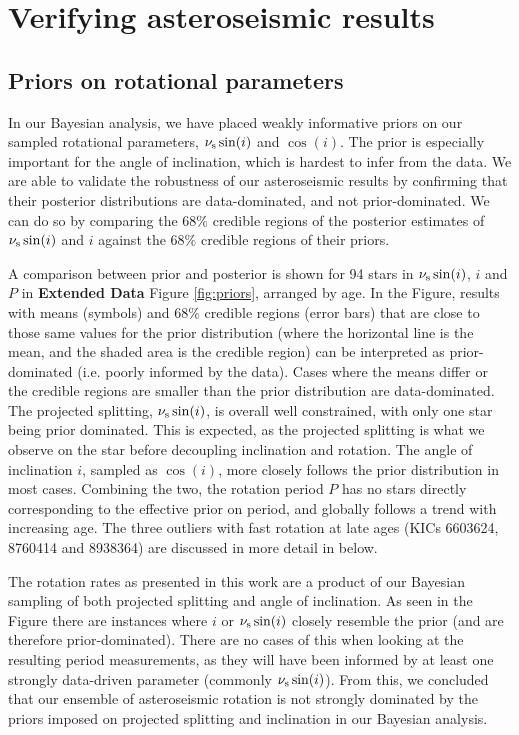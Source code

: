 \documentclass[12pt]{article}
\begin{document}
\section{Verifying asteroseismic results}
\subsection{Priors on rotational parameters}
In our Bayesian analysis, we have placed weakly informative priors on our sampled rotational parameters, $\nu_{\rm s}\sin(i)$ and $\cos(i)$. The prior is especially important for the angle of inclination, which is hardest to infer from the data. We are able to validate the robustness of our asteroseismic results by confirming that their posterior distributions are data-dominated, and not prior-dominated. We can do so by comparing the $68\%$ credible regions of the posterior estimates of $\nu_{\rm s}\sin(i)$ and $i$ against the $68\%$ credible regions of their priors.

A comparison between prior and posterior is shown for 94 stars in $\nu_{\rm s}\sin(i)$, $i$ and $P$ in \textbf{Extended Data} Figure \ref{fig:priors}, arranged by age. In the Figure, results with means (symbols) and $68\%$ credible regions (error bars) that are close to those same values for the prior distribution (where the horizontal line is the mean, and the shaded area is the credible region) can be interpreted as prior-dominated (i.e. poorly informed by the data). Cases where the means differ or the credible regions are smaller than the prior distribution are data-dominated. The projected splitting, $\nu_{\rm s}\sin(i)$, is overall well constrained, with only one star being prior dominated. This is expected, as the projected splitting is what we observe on the star before decoupling inclination and rotation. The angle of inclination $i$, sampled as $\cos(i)$, more closely follows the prior distribution in most cases. Combining the two, the rotation period $P$ has no stars directly corresponding to the effective prior on period, and globally follows a trend with increasing age. The three outliers with fast rotation at late ages (KICs 6603624, 8760414 and 8938364) are discussed in more detail in below.

The rotation rates as presented in this work are a product of our Bayesian sampling of both projected splitting and angle of inclination. As seen in the Figure there are instances where $i$ or $\nu_{\rm s}\sin(i)$ closely resemble the prior (and are therefore prior-dominated). There are no cases of this when looking at the resulting period measurements, as they will have been informed by at least one strongly data-driven parameter (commonly $\nu_{\rm s}\sin(i)$). From this, we concluded that our ensemble of asteroseismic rotation is not strongly dominated by the priors imposed on projected splitting and inclination in our Bayesian analysis.
\end{document}
